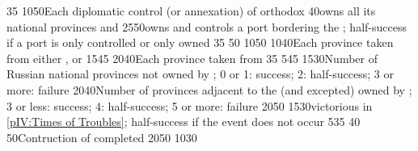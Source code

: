 %
%
{}{35}{}%
%
%
%
{10}{50}{Each diplomatic control (or annexation) of orthodox \MIN}%
%
%
{}{40}{\paysmajeurRussie owns all its national provinces and
  \provinceSmolenska}%
%
%
{25}{50}{\paysmajeurRussie owns and controls a port bordering the
  \regionBaltique; half-success if a port is only controlled or only owned}%
%
%
{}{35}{}%
%
%
{}{50}{}%
%
%
%
{10}{50}{}%
%
%
%
{10}{40}{Each province taken from either \paysmajeurPologne,
  \paysmajeurLithuanie or \paysukraine}%
%
%
{15}{45}{}%
%
%
{20}{40}{Each province taken from \paysCrimee}%
%
%
{}{35}{}%
%
%
%
{5}{45}{}%
%
%
{15}{30}{Number of Russian national provinces not owned by \paysmajeurRussie;
  0 or 1: success; 2: half-success; 3 or more: failure}%
%
%
{20}{40}{Number of provinces adjacent to the \regionBaltique (\regionSuede and
  \regionFinlande excepted) owned by \paysmajeurSuede; 3 or less: success; 4:
  half-success; 5 or more: failure}%
%
%
%
{20}{50}{}%
%
%
{15}{30}{\RUS victorious in \ref{pIV:Times of Troubles}; half-success if the
  event does not occur}%
%
%
%
{5}{35}{}%
%
%
{}{40}{}%
%
%
{}{50}{Contruction of  completed}%
%
%
{20}{50}{}%
%
\EUobjective{}{\granderegionAmour/\granderegionBaikal}{\COL/\TP}%
{10}{30}{}%

